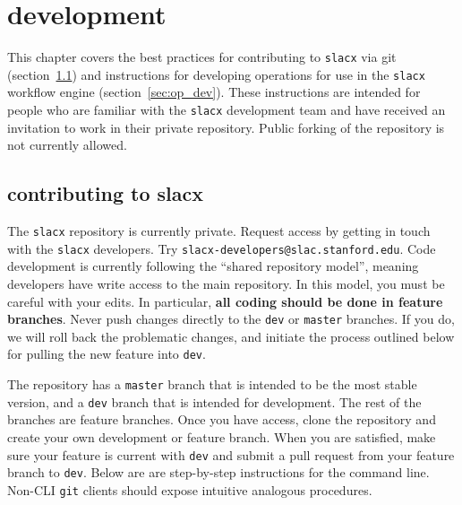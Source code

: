 \chapter{development}
\label{ch:dev}

This chapter covers the best practices 
for contributing to \verb|slacx| via git (section~\ref{sec:slacx_dev})
and instructions for developing operations
for use in the \verb|slacx| workflow engine (section~\ref{sec:op_dev}).
These instructions are intended for people
who are familiar with the \verb|slacx| development team
and have received an invitation to work in their private repository.
Public forking of the repository is not currently allowed.

\section{contributing to slacx}
\label{sec:slacx_dev}

The \verb|slacx| repository is currently private.
Request access by getting in touch with the \verb|slacx| developers.
Try \verb|slacx-developers@slac.stanford.edu|. 
Code development is currently following the ``shared repository model'',
meaning developers have write access to the main repository.
In this model, you must be careful with your edits.
In particular, \textbf{all coding should be done in feature branches}.
Never push changes directly to the \verb|dev| or \verb|master| branches.
If you do, we will roll back the problematic changes, 
and initiate the process outlined below for pulling the new feature into \verb|dev|.

The repository has a \verb|master| branch that is intended to be the most stable version,
and a \verb|dev| branch that is intended for development.
The rest of the branches are feature branches.
Once you have access, clone the repository
and create your own development or feature branch.
When you are satisfied, make sure your feature is current with \verb|dev|
and submit a pull request from your feature branch to \verb|dev|.
Below are are step-by-step instructions for the command line.
Non-CLI \verb|git| clients should expose intuitive analogous procedures.

